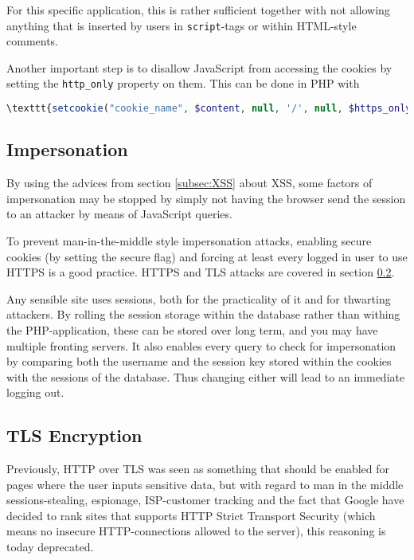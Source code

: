 \documentclass[a4paper]{scrartcl}
\begin{document}
For this specific application, this is rather sufficient together with not allowing anything that is inserted by users in \texttt{script}-tags or within HTML-style comments.

Another important step is to disallow JavaScript from accessing the cookies by setting the \texttt{http\_only} property on them. This can be done in PHP with 

\begin{lstlisting}[language=PHP]
\texttt{setcookie("cookie_name", $content, null, '/', null, $https_only, true);}
\end{lstlisting}

\subsection{Impersonation}

By using the advices from section \ref{subsec:XSS} about XSS, some factors of impersonation may be stopped by simply not having the browser send the session to an attacker by means of JavaScript queries.

To prevent man-in-the-middle style impersonation attacks, enabling secure cookies (by setting the secure flag) and forcing at least every logged in user to use HTTPS is a good practice. HTTPS and TLS attacks are covered in section \ref{subsec:SSL}.

Any sensible site uses sessions, both for the practicality of it and for thwarting attackers. By rolling the session storage within the database rather than withing the PHP-application, these can be stored over long term, and you may have multiple fronting servers. It also enables every query to check for impersonation by comparing both the username and the session key stored within the cookies with the sessions of the database. Thus changing either will lead to an immediate logging out.

\subsection{TLS Encryption}
\label{subsec:SSL}

Previously, HTTP over TLS was seen as something that should be enabled for pages where the user inputs sensitive data, but with regard to man in the middle sessions-stealing, espionage, ISP-customer tracking and the fact that Google have decided to rank sites that supports HTTP Strict Transport Security (which means no insecure HTTP-connections allowed to the server), this reasoning is today deprecated.
\end{document}
